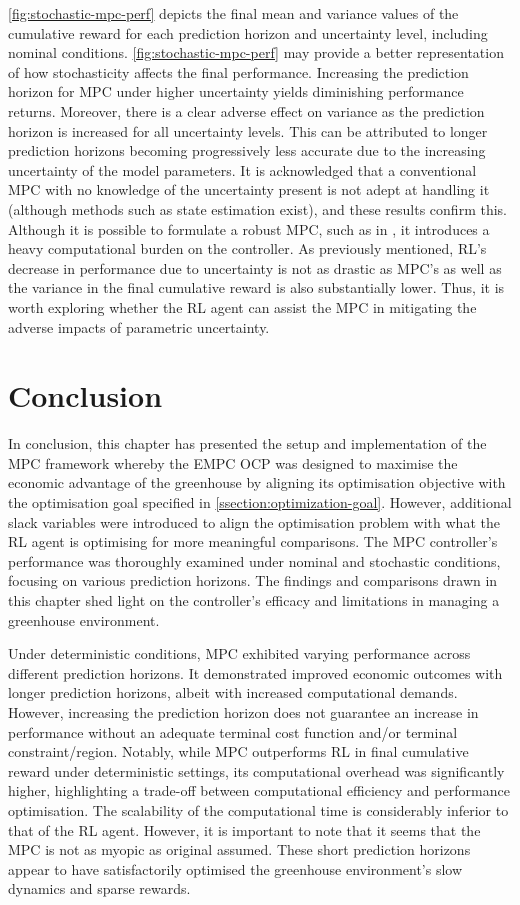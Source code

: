 \autoref{fig:stochastic-mpc-perf} depicts the final mean and variance values of the cumulative reward for each prediction horizon and uncertainty level, including nominal conditions. \autoref{fig:stochastic-mpc-perf} may provide a better representation of how stochasticity affects the final performance. Increasing the prediction horizon for MPC under higher uncertainty yields diminishing performance returns. Moreover, there is a clear adverse effect on variance as the prediction horizon is increased for all uncertainty levels. This can be attributed to longer prediction horizons becoming progressively less accurate due to the increasing uncertainty of the model parameters. It is acknowledged that a conventional MPC with no knowledge of the uncertainty present is not adept at handling it (although methods such as state estimation exist), and these results confirm this. Although it is possible to formulate a robust MPC, such as in \citet{boersmaRobustSamplebasedModel2022}, it introduces a heavy computational burden on the controller. As previously mentioned, RL’s decrease in performance due to uncertainty is not as drastic as MPC’s as well as the variance in the final cumulative reward is also substantially lower. Thus, it is worth exploring whether the RL agent can assist the MPC in mitigating the adverse impacts of parametric uncertainty.


\section{Conclusion}

In conclusion, this chapter has presented the setup and implementation of the MPC framework whereby the EMPC OCP was designed to maximise the economic advantage of the greenhouse by aligning its optimisation objective with the optimisation goal specified in \autoref{ssection:optimization-goal}. However, additional slack variables were introduced to align the optimisation problem with what the RL agent is optimising for more meaningful comparisons. The MPC controller’s performance was thoroughly examined under nominal and stochastic conditions, focusing on various prediction horizons. The findings and comparisons drawn in this chapter shed light on the controller’s efficacy and limitations in managing a greenhouse environment.

Under deterministic conditions, MPC exhibited varying performance across different prediction horizons. It demonstrated improved economic outcomes with longer prediction horizons, albeit with increased computational demands. However, increasing the prediction horizon does not guarantee an increase in performance without an adequate terminal cost function and/or terminal constraint/region. Notably, while MPC outperforms RL in final cumulative reward under deterministic settings, its computational overhead was significantly higher, highlighting a trade-off between computational efficiency and performance optimisation. The scalability of the computational time is considerably inferior to that of the RL agent. However, it is important to note that it seems that the MPC is not as myopic as original assumed. These short prediction horizons appear to have satisfactorily optimised the greenhouse environment's slow dynamics and sparse rewards. 

